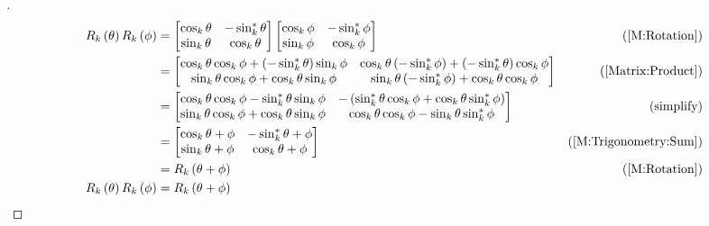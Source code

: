 \documentclass[stu, babel, american, biblatex, a4paper, leqno, draftall]{apa7}
\begin{document}
\begin{proof}[]
    \begin{align*}
        R_k\left(\theta\right)R_k\left(\phi\right)
         & =\begin{bmatrix}
                \cos_k{\theta} & -\sin_k^\ast{\theta} \\
                \sin_k{\theta} & \cos_k{\theta}       \\
            \end{bmatrix}\begin{bmatrix}
                             \cos_k{\phi} & -\sin_k^\ast{\phi} \\
                             \sin_k{\phi} & \cos_k{\phi}       \\
                         \end{bmatrix}                                                       & \text{(\cref{M:Rotation})}              \\
         & =\begin{bmatrix}
                \cos_k{\theta}\cos_k{\phi}+\left(-\sin_k^\ast{\theta}\right)\sin_k{\phi} &
                \cos_k{\theta}\left(-\sin_k^\ast{\phi}\right)+\left(-\sin_k^\ast{\theta}\right)\cos_k{\phi} \\
                \sin_k{\theta}\cos_k{\phi}+\cos_k{\theta}\sin_k{\phi}                    &
                \sin_k{\theta}\left(-\sin_k^\ast{\phi}\right)+\cos_k{\theta}\cos_k{\phi}                    \\
            \end{bmatrix} & \text{(\cref{Matrix:Product})}                                \\
         & =\begin{bmatrix}
                \cos_k{\theta}\cos_k{\phi}-\sin_k^\ast{\theta}\sin_k{\phi} &
                -\left(\sin_k^\ast{\theta}\cos_k{\phi}+\cos_k{\theta}\sin_k^\ast{\phi}\right) \\
                \sin_k{\theta}\cos_k{\phi}+\cos_k{\theta}\sin_k{\phi}      &
                \cos_k{\theta}\cos_k{\phi}-\sin_k{\theta}\sin_k^\ast{\phi}                    \\
            \end{bmatrix}               & \text{(simplify)}                                              \\
         & =\begin{bmatrix}
                \cos_k{\theta+\phi} & -\sin_k^\ast{\theta+\phi} \\
                \sin_k{\theta+\phi} & \cos_k{\theta+\phi}       \\
            \end{bmatrix}                                             & \text{(\cref{M:Trigonometry:Sum})}                             \\
         & = R_k\left(\theta+\phi\right)                                                                  & \text{(\cref{M:Rotation})} \\
        R_k\left(\theta\right)R_k\left(\phi\right)
         & = R_k\left(\theta+\phi\right)                                                                  & \qedhere
    \end{align*}
\end{proof}
\end{document}
